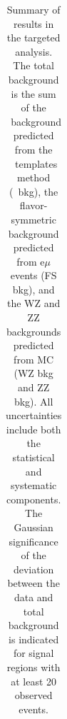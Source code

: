 \begin{table}[htb]
\begin{center}
\footnotesize
\caption{\label{tab:results_targ}\footnotesize Summary of results in the targeted analysis. The total background is the sum of the \zjets\ background predicted from
the \MET\ templates method (\zjets\ bkg), the flavor-symmetric background predicted from e$\mu$ events (FS bkg), and the WZ and ZZ backgrounds predicted from MC
(WZ bkg and ZZ bkg). All uncertainties include both the statistical and systematic components. The Gaussian significance of the deviation between the data 
and total background is indicated for signal regions with at least 20 observed events. }
\begin{tabular}{l|c|c|c|c}




\end{tabular}
\end{center}
\end{table}
